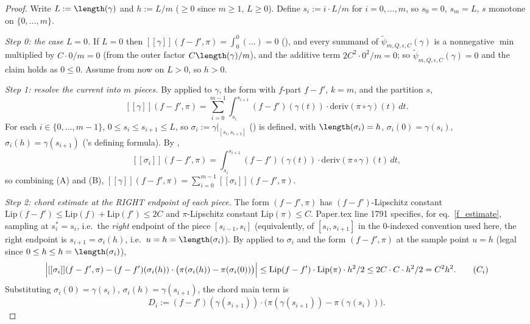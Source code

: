 \begin{proof}
  Write $L := \length(\gamma)$ and $h := L/m$ ($\ge 0$ since $m \ge 1$, $L \ge 0$). Define
  $s_i := i\cdot L/m$ for $i=0,\dots,m$, so $s_0=0$, $s_m=L$, $s$ monotone on $\{0,\dots,m\}$.

  \emph{Step 0: the case $L=0$.} If $L=0$ then $[[\gamma]](f-f',\pi)=\int_0^0(\dots)=0$
  (), and every summand of $\tilde\psi_{m,Q,\epsilon,C}(\gamma)$ is a
  nonnegative $\min$ multiplied by $C\cdot0/m=0$ (from the outer factor $C\length(\gamma)/m$), and
  the additive term $2C^2\cdot0^2/m=0$; so $\tilde\psi_{m,Q,\epsilon,C}(\gamma)=0$ and the claim
  holds as $0\le0$. Assume from now on $L>0$, so $h>0$.

  \emph{Step 1: resolve the current into $m$ pieces.} By 
  applied to $\gamma$, the form with $f$-part $f-f'$, $k=m$, and the partition $s$,
  \[
    [[\gamma]](f-f',\pi) = \sum_{i=0}^{m-1} \int_{s_i}^{s_{i+1}} (f-f')(\gamma(t)) \cdot
      \mathrm{deriv}(\pi\circ\gamma)(t)\,dt
    . \tag{A}
  \]
  For each $i\in\{0,\dots,m-1\}$, $0\le s_i\le s_{i+1}\le L$, so $\sigma_i:=\gamma|_{[s_i,s_{i+1}]}$
  () is defined, with $\length(\sigma_i)=h$, $\sigma_i(0)=\gamma(s_i)$,
  $\sigma_i(h)=\gamma(s_{i+1})$ ('s defining formula). By
  ,
  \[
    [[\sigma_i]](f-f',\pi) = \int_{s_i}^{s_{i+1}} (f-f')(\gamma(t)) \cdot
      \mathrm{deriv}(\pi\circ\gamma)(t)\,dt
    , \tag{B}
  \]
  so combining (A) and (B), $[[\gamma]](f-f',\pi) = \sum_{i=0}^{m-1}[[\sigma_i]](f-f',\pi)$.

  \emph{Step 2: chord estimate at the RIGHT endpoint of each piece.} The form $(f-f',\pi)$ has
  $(f-f')$-Lipschitz constant $\mathrm{Lip}(f-f') \le \mathrm{Lip}(f)+\mathrm{Lip}(f') \le 2C$ and
  $\pi$-Lipschitz constant $\mathrm{Lip}(\pi)\le C$. Paper.tex line 1791 specifies, for
  eq.~\eqref{f_estimate}, sampling at $s_i^*=s_i$, i.e.\ the \emph{right} endpoint of the piece
  $[s_{i-1},s_i]$ (equivalently, of $[s_i,s_{i+1}]$ in the $0$-indexed convention used here, the
  right endpoint is $s_{i+1}=\sigma_i(h)$, i.e.\ $u=h=\length(\sigma_i)$). By
   applied to $\sigma_i$ and the form $(f-f',\pi)$ at the sample
  point $u=h$ (legal since $0\le h\le h=\length(\sigma_i)$),
  \[
    \Bigl|[[\sigma_i]](f-f',\pi) - (f-f')(\sigma_i(h)) \cdot
      \bigl(\pi(\sigma_i(h))-\pi(\sigma_i(0))\bigr)\Bigr|
      \le \mathrm{Lip}(f-f')\cdot\mathrm{Lip}(\pi)\cdot h^2/2 \le 2C\cdot C\cdot h^2/2 = C^2h^2
    . \tag{$C_i$}
  \]
  Substituting $\sigma_i(0)=\gamma(s_i)$, $\sigma_i(h)=\gamma(s_{i+1})$, the chord main term is
  \[
    D_i := (f-f')(\gamma(s_{i+1})) \cdot \bigl(\pi(\gamma(s_{i+1}))-\pi(\gamma(s_i))\bigr)
    .
  \]


\end{proof}
